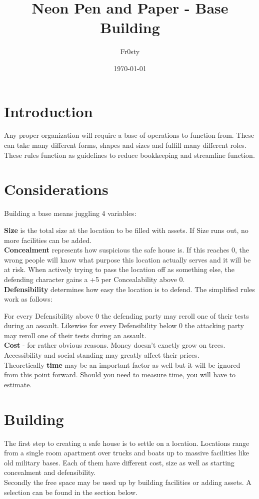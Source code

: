 \documentclass[12pt,a4paper,openany]{book}
\title{Neon Pen and Paper - Base Building}
\author{Fr0sty}
\date{\today}
\begin{document}
	
	
	\chapter{Introduction}
	Any proper organization will require a base of operations to function from. These can take many different forms, shapes and sizes and fulfill many different roles. These rules function as guidelines to reduce bookkeeping and streamline function.
	
	\chapter{Considerations}
	Building a base means juggling 4 variables: \par
	\textbf{Size} is the total size at the location to be filled with assets. If Size runs out, no more facilities can be added.\\
	\textbf{Concealment} represents how suspicious the safe house is. If this reaches 0, the wrong people will know what purpose this location actually serves and it will be at risk. When actively trying to pass the location off as something else, the defending character gains a +5 per Concealability above 0.\\
	\textbf{Defensibility} determines how easy the location is to defend. The simplified rules work as follows: \par \vspace*{-10mm}
	\hspace{15mm}For every Defensibility above 0 the defending party may reroll one of their tests during an assault. Likewise for every Defensibility below 0 the attacking party may reroll one of their tests during an assault.\\
	\textbf{Cost} - for rather obvious reasons. Money doesn't exactly grow on trees. Accessibility and social standing may greatly affect their prices.\\
	Theoretically \textbf{time} may be an important factor as well but it will be ignored from this point forward. Should you need to measure time, you will have to estimate. 
	
	\chapter{Building}
	The first step to creating a safe house is to settle on a location. Locations range from a single room apartment over trucks and boats up to massive facilities like old military bases. Each of them have different cost, size as well as starting concealment and defensibility. \\
	Secondly the free space may be used up by building facilities or adding assets. A selection can be found in the section below.
	
\end{document}
